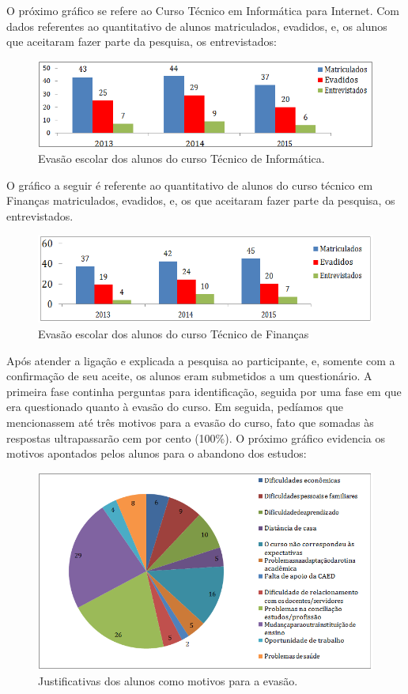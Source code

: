 \documentclass[article,12pt,onesidea,4paper,english,brazil]{abntex2}
\begin{document}
O próximo gráfico se refere ao Curso Técnico em Informática para Internet. Com dados referentes ao quantitativo de alunos matriculados, evadidos, e, os alunos que aceitaram fazer parte da pesquisa, os entrevistados:
\begin{figure}[h]
	\centering
	\includegraphics[width=0.5\linewidth]{pip-pg78-02}
	\caption{Evasão escolar dos alunos do curso Técnico de Informática.}
	\label{fig:pip-pg78-02}
\end{figure}

O gráfico a seguir é referente ao quantitativo de alunos do curso técnico em Finanças matriculados, evadidos, e, os que aceitaram fazer parte da pesquisa, os entrevistados.
\begin{figure}[h]
	\centering
	\includegraphics[width=0.5\linewidth]{pip-pg78-03}
	\caption{Evasão escolar dos alunos do curso Técnico de Finanças}
	\label{fig:pip-pg78-03}
\end{figure}


Após atender a ligação e explicada a pesquisa ao participante, e, somente com a confirmação de seu aceite, os alunos eram submetidos a um questionário. A
primeira fase continha perguntas para identificação, seguida por uma fase em que era questionado quanto à evasão do curso. Em seguida, pedíamos que mencionassem até três motivos para a evasão do curso, fato que somadas às respostas ultrapassarão cem por cento (100\%). O próximo gráfico evidencia os motivos apontados pelos alunos para o abandono dos estudos:
\begin{figure}[h]
	\centering
	\includegraphics[width=0.7\linewidth]{pip-pg78-04}
	\caption{Justificativas dos alunos como motivos para a evasão.}
	\label{fig:pip-pg78-04}
\end{figure}
\end{document}
